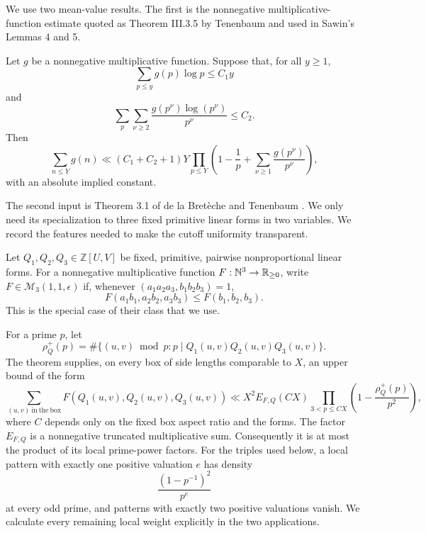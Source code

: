 \documentclass[11pt]{article}
\begin{document}
We use two mean-value results. The first is the nonnegative
multiplicative-function estimate quoted as Theorem III.3.5 by Tenenbaum
\cite{Tenenbaum2015} and used in Sawin's Lemmas 4 and 5.

\begin{proposition}\label{prop:one-variable}
Let \(g\) be a nonnegative multiplicative function. Suppose that, for all
\(y\geq1\),
\[
 \sum_{p\leq y}g(p)\log p\leq C_1y
\]
and
\[
 \sum_p\sum_{\nu\geq2}
 \frac{g(p^\nu)\log(p^\nu)}{p^\nu}\leq C_2.
\]
Then
\[
 \sum_{n\leq Y}g(n)
 \ll (C_1+C_2+1)Y
 \prod_{p\leq Y}
 \left(1-\frac1p+
       \sum_{\nu\geq1}\frac{g(p^\nu)}{p^\nu}\right),
\]
with an absolute implied constant.
\end{proposition}

The second input is Theorem 3.1 of de la Bret\`eche and Tenenbaum
\cite{BretecheTenenbaum2026}. We only need its specialization to three fixed
primitive linear forms in two variables. We record the features needed to
make the cutoff uniformity transparent.

Let \(Q_1,Q_2,Q_3\in\mathbb Z[U,V]\) be fixed, primitive, pairwise
nonproportional linear forms. For a nonnegative multiplicative function
\(F:\mathbb N^3\to\mathbb R_{\geq0}\), write \(F\in\mathcal M_3(1,1,\epsilon)\) if, whenever
\((a_1a_2a_3,b_1b_2b_3)=1\),
\[
 F(a_1b_1,a_2b_2,a_3b_3)
 \leq F(b_1,b_2,b_3).
\]
This is the special case of their class that we use.

For a prime \(p\), let
\[
 \rho_Q^+(p)=
 \#\{(u,v)\bmod p:p\mid Q_1(u,v)Q_2(u,v)Q_3(u,v)\}.
\]
The theorem supplies, on every box of side lengths comparable to \(X\),
an upper bound of the form
\begin{equation}\label{eq:dBT-shape}
 \sum_{(u,v)\ \mathrm{in\ the\ box}}
 F(Q_1(u,v),Q_2(u,v),Q_3(u,v))
 \ll
 X^2E_{F,Q}(C X)
 \prod_{3<p\leq C X}
 \left(1-\frac{\rho_Q^+(p)}{p^2}\right),
\end{equation}
where \(C\) depends only on the fixed box aspect ratio and the forms.
The factor \(E_{F,Q}\) is a nonnegative truncated multiplicative sum.
Consequently it is at most the product of its local prime-power factors.
For the triples used below, a local pattern with exactly one positive
valuation \(e\) has density
\begin{equation}\label{eq:axis-density}
 \frac{(1-p^{-1})^2}{p^e}
\end{equation}
at every odd prime, and patterns with exactly two positive valuations
vanish. We calculate every remaining local weight explicitly in the two
applications.
\end{document}
